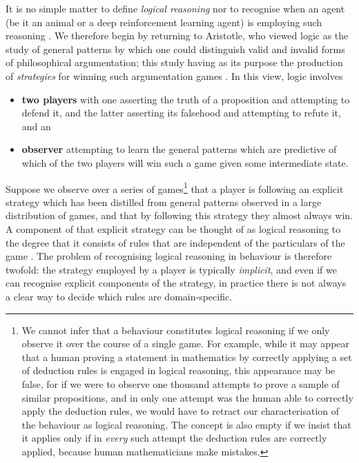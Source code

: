 \documentclass{article} %
\begin{document}
It is no simple matter to define \emph{logical reasoning} nor to recognise when an agent (be it an animal or a deep reinforcement learning agent) is employing such reasoning \citep{britannica2, barrett}. We therefore begin by returning to Aristotle, who viewed logic as the study of general patterns by which one could distinguish valid and invalid forms of philosophical argumentation; this study having as its purpose the production of \emph{strategies} for winning such argumentation games \citep{aristotle, aristotle-logic, britannica}. In this view, logic involves
\begin{itemize}
\item \textbf{two players} with one asserting the truth of a proposition and attempting to defend it, and the latter asserting its falsehood and attempting to refute it, and an
\item \textbf{observer} attempting to learn the general patterns which are predictive of which of the two players will win such a game given some intermediate state.
\end{itemize}
Suppose we observe over a series of games\footnote{We cannot infer that a behaviour constitutes logical reasoning if we only observe it over the course of a single game. For example, while it may appear that a human proving a statement in mathematics by correctly applying a set of deduction rules is engaged in logical reasoning, this appearance may be false, for if we were to observe one thousand attempts to prove a sample of similar propositions, and in only one attempt was the human able to correctly apply the deduction rules, we would have to retract our characterisation of the behaviour as logical reasoning. The concept is also empty if we insist that it applies only if in \emph{every} such attempt the deduction rules are correctly applied, because human mathematicians make mistakes.} that a player is following an explicit strategy which has been distilled from general patterns observed in a large distribution of games, and that by following this strategy they almost always win. A component of that explicit strategy can be thought of as logical reasoning to the degree that it consists of rules that are independent of the particulars of the game \cite[\S 11.25]{aristotle}. The problem of recognising logical reasoning in behaviour is therefore twofold: the strategy employed by a player is typically \emph{implicit}, and even if we can recognise explicit components of the strategy, in practice there is not always a clear way to decide which rules are domain-specific.
\end{document}
